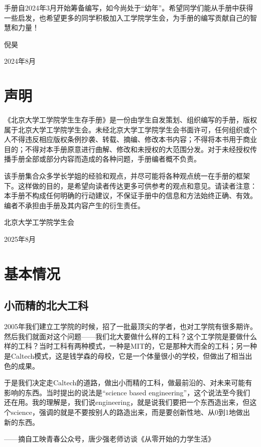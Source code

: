 \documentclass[11pt,oneside]{book}
\begin{document}
手册自2024年3月开始筹备编写，如今尚处于“幼年”。希望同学们能从手册中获得一些启发，也希望更多的同学积极加入工学院学生会，为手册的编写贡献自己的智慧和力量！
\begin{flushright}
    倪昊

    2024年8月
\end{flushright}


\chapter*{声明}

《北京大学工学院学生生存手册》是一份由学生自发策划、组织编写的手册，版权属于北京大学工学院学生会。未经北京大学工学院学生会书面许可，任何组织或个人不得违反相应版权条例抄袭、转载、摘编、修改本书内容；不得将本书用于商业目的；不得对本手册原意进行曲解、修改和未授权的大范围分发。对于未经授权传播手册全部或部分内容而造成的各种问题，手册编者概不负责。

该手册集合众多学长学姐的经验和观点，并尽可能将各种观点统一在手册的框架下。这样做的目的，是希望向读者传达更多可供参考的观点和意见。请读者注意：本手册不构成任何明确的行动建议，不保证手册中的信息和方法始终正确、有效。编者不承担由手册及其内容产生的衍生责任。
\begin{flushright}
    北京大学工学院学生会

    2025年8月
\end{flushright}

\tableofcontents

\mainmatter

\chapter{基本情况}
\section{小而精的北大工科}
2005年我们建立工学院的时候，招了一批最顶尖的学者，也对工学院有很多期许。然后我们就面对这个问题——我们北大要做什么样的工科？这个工学院是要做什么样的工科？当时工科有两种模式，一种是MIT的，它是那种大而全的工科；另一种是Caltech模式，这是钱学森的母校，它是一个体量很小的学校，但做出了相当出色的成果。

于是我们决定走Caltech的道路，做出小而精的工科，做最前沿的、对未来可能有影响的东西。当时提出的说法是“science based engineering”，这个说法至今我们还在用。我的理解是，我们说engineering，就是说我们要把一个东西造出来，但这个science，强调的就是不要按别人的路造出来，而是要创新性地、从0到1地做出新的东西。
\begin{flushright}
    ——摘自工映青春公众号，唐少强老师访谈《从零开始的力学生活》

\end{flushright}
\end{document}
